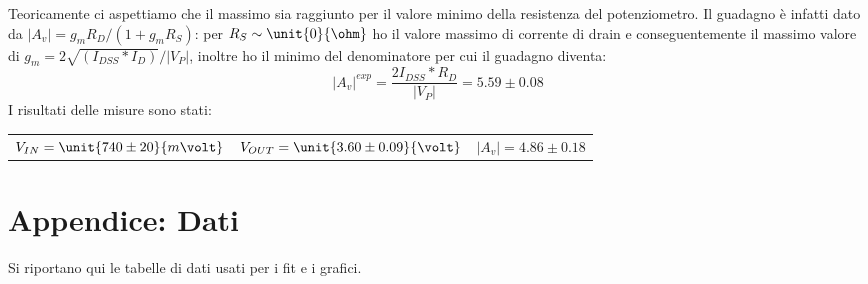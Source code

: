 \documentclass[10pt,a4paper]{article}
\begin{document}
Teoricamente ci aspettiamo che il massimo sia raggiunto per il valore minimo della resistenza del potenziometro.
Il guadagno è infatti dato da $|A_v| =g_mR_D/(1+g_mR_S)$: per $R_S\sim\unit{0}{\ohm}$ ho il valore massimo di corrente di drain e conseguentemente il massimo valore di $g_m = 2 \sqrt{(I_{DSS}*I_D)}/|V_P|$, inoltre ho il minimo del denominatore per cui il guadagno diventa:
\begin{equation*}
|A_v|^{exp} = \frac{2 I_{DSS}*R_D}{|V_P|} = 5.59 \pm 0.08 
\end{equation*}
I risultati delle misure sono stati:
\begin{table}[h!]
	\centering
	\begin{tabular}{ccc}
		$V_{IN}=\unit{740 \pm 20}{m\volt}$ & $V_{OUT} = \unit{3.60 \pm 0.09}{\volt}$ & $|A_v| = 4.86 \pm 0.18$\\
	\end{tabular}
\end{table}

\pagebreak
\section{Appendice: Dati}
Si riportano qui le tabelle di dati usati per i fit e i grafici.

\centering
\begin{figure}[h!]
	\begin{minipage}[t]{0.33\textwidth}
		\centering
		\resizebox{1\textwidth}{!}{
		}
		\label{njfet}
	\end{minipage}
	\begin{minipage}[t]{0.33\textwidth}
		\resizebox{1\textwidth}{!}{
		}
		\label{tab:commonsource}
	\end{minipage}
	\begin{minipage}[t]{0.32\textwidth}
		\centering
		\resizebox{1\textwidth}{!}{
		}
		\label{tab:sourcefollower}
	\end{minipage}
\end{figure}

	\begin{minipage}[c]{0.33\textwidth}
		\centering
		\resizebox{1\textwidth}{!}{
			}
		\label{tab:iddependance}
	\end{minipage}
\end{document}
